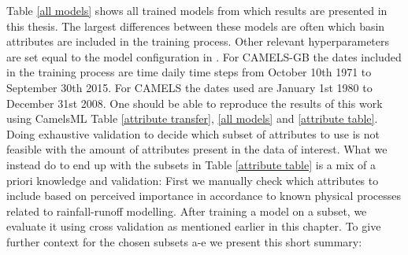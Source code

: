 Table \ref{all models} shows all trained models from which results are presented in this 
thesis. The largest differences between these models are often which basin attributes 
are included in the training process. Other relevant hyperparameters are set equal 
to the model configuration in \citet{lstm_second_paper}. For CAMELS-GB the dates included 
in the training process are time daily time steps from October 10th 1971 to September 
30th 2015.
For CAMELS the dates used are January 1st 1980 to December 31st 2008.
One should be able to reproduce the results 
of this work using CamelsML Table \ref{attribute transfer}, \ref{all models} and \ref{attribute table}. 
Doing exhaustive validation to decide which subset of attributes to use is not 
feasible with the amount of attributes present in the data of interest. What we instead 
do to end up with the subsets in Table \ref{attribute table} is a mix of a priori 
knowledge and validation: First we manually check which attributes to include based 
on perceived importance in accordance to known physical processes related to rainfall-runoff 
modelling. After training a model on a subset, we evaluate it using cross validation 
as mentioned earlier in this chapter. To give further context for the chosen subsets 
a-e we present this short summary:
